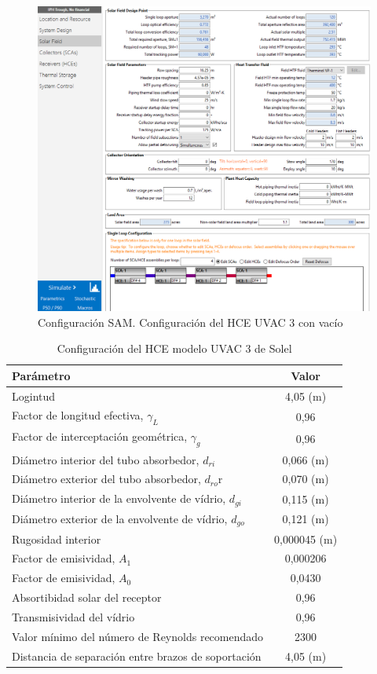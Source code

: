 \begin{figure}[!h]
\includegraphics[width=0.9\linewidth]{images/captura_sam_iph03.png}
\caption{Configuración SAM. Configuración del HCE UVAC 3 con vacío}
\label{fig:captura04}
\end{figure}


\begin{table}[!h]
\centering
\caption{Configuración del HCE modelo UVAC 3 de Solel}
\label{tab:configuracionHCE}
\begin{tabular}{lc}
Parámetro & Valor \\ \hline
Logintud & 4,05 (m) \\
Factor de longitud efectiva, \(\gamma_L\) &  0,96 \\
Factor de interceptación geométrica, \(\gamma_g\) & 0,96 \\
Diámetro interior del tubo absorbedor, \(d_{ri}\) & 0,066 (m) \\
Diámetro exterior del tubo absorbedor, \(d_{ro}\)r &  0,070 (m) \\ 
Diámetro interior de la envolvente de vídrio, \(d_{gi}\) &  0,115 (m) \\
Diámetro exterior de la envolvente de vídrio, \(d_{go}\) &  0,121 (m) \\
Rugosidad interior &  0,000045 (m)  \\
Factor de emisividad, \(A_1\) &  0,000206 \\
Factor de emisividad, \(A_0\) &  0,0430 \\
Absortibidad solar del receptor &  0,96 \\
Transmisividad del vídrio &  0,96 \\
Valor mínimo del número de Reynolds recomendado &  2300 \\
Distancia de separación entre brazos de soportación &  4,05 (m) 
\end{tabular}
\end{table}

